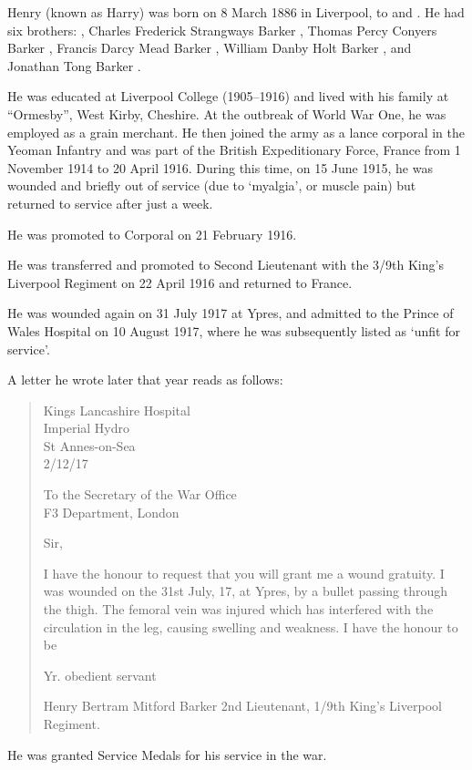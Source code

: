 
Henry (known as Harry) was born on 8 March 1886 in Liverpool,\cite{HBMBarkerBirth} to  and \cite{HBMBarkerBirth}. He had six brothers: , Charles Frederick Strangways Barker , Thomas Percy Conyers Barker , Francis Darcy Mead Barker , William Danby Holt Barker , and Jonathan Tong Barker .

He was educated at Liverpool College (1905--1916) and lived with his family at ``Ormesby'', West Kirby, Cheshire.  At the outbreak of World War One, he was employed as a grain merchant.  He then joined the army as a lance corporal in the Yeoman Infantry and  was part of the British Expeditionary Force, France from 1 November 1914 to 20 April 1916. During this time, on 15 June 1915, he was wounded and briefly out of service (due to `myalgia', or muscle pain) but returned to service after just a week.\cite{HBMBarkerCasualtyForm}

He was promoted to Corporal on 21 February 1916.\cite{HBMBarkerCasualtyForm}

He was transferred and promoted to Second Lieutenant with the 3/9th King's Liverpool Regiment on 22 April 1916 and returned to France. 

He was wounded again on 31 July 1917 at Ypres, and admitted to the Prince of Wales Hospital on 10 August 1917, where he  was subsequently listed as `unfit for service'.

A letter he wrote later that year reads as follows:\cite{HBMBarkerWarrecord}

\begin{quotation}
\begin{raggedleft}
Kings Lancashire Hospital \\
Imperial Hydro \\
St Annes-on-Sea \\
2/12/17 \\
\end{raggedleft}

To the Secretary of the War Office \\
F3 Department, London

Sir,

I have the honour to request that you will grant me a wound gratuity.  I was wounded on the 31st July, 17, at Ypres, by a bullet passing through the thigh.  The femoral vein was injured which has interfered with the circulation in the leg, causing swelling and weakness.  I have the honour to be

Yr. obedient servant

Henry Bertram Mitford Barker 2nd Lieutenant, 1/9th King's Liverpool Regiment.
\end{quotation}

He was granted Service Medals for his service \cite{HBMBarkerMedal} in the war.
